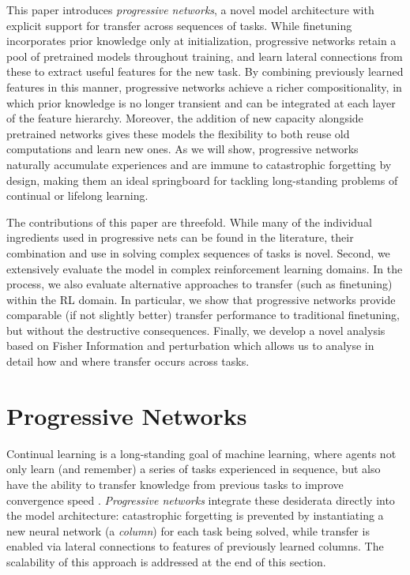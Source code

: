 \documentclass{article}
\begin{document}
This paper introduces \textit{progressive networks}, a novel model architecture
with explicit support for transfer across sequences of tasks. While finetuning
incorporates prior knowledge only at initialization, progressive networks
retain a pool of pretrained models throughout training, and learn lateral connections
from these to extract useful features for the new task.  By combining previously
learned features in this
manner, progressive networks achieve a richer compositionality, in which prior
knowledge is no longer transient and can be integrated at each layer of the
feature hierarchy. Moreover, the addition of new capacity alongside pretrained
networks gives these models the flexibility to both reuse old computations and learn new ones.
As we will show, progressive networks naturally accumulate experiences and
are immune to catastrophic forgetting by design, making them an ideal
springboard for tackling long-standing problems of continual or lifelong
learning.

The contributions of this paper are threefold. While many of the individual
ingredients used in progressive nets can be found in the literature, their
combination and use in solving complex sequences of tasks is novel. Second,
we extensively evaluate the model in complex reinforcement learning domains.
In the process, we also evaluate alternative approaches to transfer
(such as finetuning) within the RL domain. In particular, we show that
progressive networks provide comparable (if not slightly better) transfer
performance to traditional finetuning, but without the destructive
consequences. Finally, we develop a novel analysis based on
Fisher Information and perturbation which allows us to analyse in
detail how and where transfer occurs across tasks.



\section{Progressive Networks}

Continual learning is a long-standing goal of machine learning, where agents
not only learn (and remember) a series of tasks experienced in sequence, but also have
the ability to transfer knowledge from previous tasks to improve convergence speed \cite{AAAIMag11-Taylor}.
\textit{Progressive networks} integrate these desiderata directly into the
model architecture: catastrophic forgetting is prevented by instantiating a new
neural network (a \textit{column}) for each task being solved, while transfer is
enabled via lateral connections to features of previously learned columns. The
scalability of this approach is addressed at the end of this section.
\end{document}
